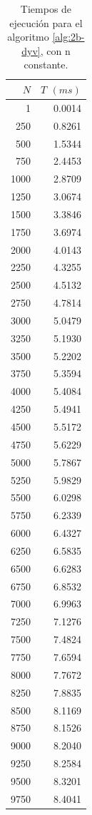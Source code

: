 \begin{table}
	\footnotesize
	\centering
	\begin{tabular}{|r|r|}
		\hline
		$N$ & $T$ $(ms)$ \\
		\hline
        1 & 0.0014 \\ 
		250 & 0.8261 \\ 
		500 & 1.5344 \\ 
		750 & 2.4453 \\ 
		1000 & 2.8709 \\ 
		1250 & 3.0674 \\ 
		1500 & 3.3846 \\ 
		1750 & 3.6974 \\ 
		2000 & 4.0143 \\ 
		2250 & 4.3255 \\ 
		2500 & 4.5132 \\ 
		2750 & 4.7814 \\ 
		3000 & 5.0479 \\ 
		3250 & 5.1930 \\ 
		3500 & 5.2202 \\ 
		3750 & 5.3594 \\ 
		4000 & 5.4084 \\ 
		4250 & 5.4941 \\ 
		4500 & 5.5172 \\ 
		4750 & 5.6229 \\ 
		5000 & 5.7867 \\ 
		5250 & 5.9829 \\ 
		5500 & 6.0298 \\ 
		5750 & 6.2339 \\ 
		6000 & 6.4327 \\ 
		6250 & 6.5835 \\ 
		6500 & 6.6283 \\ 
		6750 & 6.8532 \\ 
		7000 & 6.9963 \\ 
		7250 & 7.1276 \\ 
		7500 & 7.4824 \\ 
		7750 & 7.6594 \\ 
		8000 & 7.7672 \\ 
		8250 & 7.8835 \\ 
		8500 & 8.1169 \\ 
		8750 & 8.1526 \\ 
		9000 & 8.2040 \\ 
		9250 & 8.2584 \\ 
		9500 & 8.3201 \\ 
		9750 & 8.4041 \\ 
		\hline
	\end{tabular}
	\caption{Tiempos de ejecución para el algoritmo 
		\ref{alg:2b-dyv}, con n constante.}
	\label{tab:2b-dyv-k}
\end{table}


